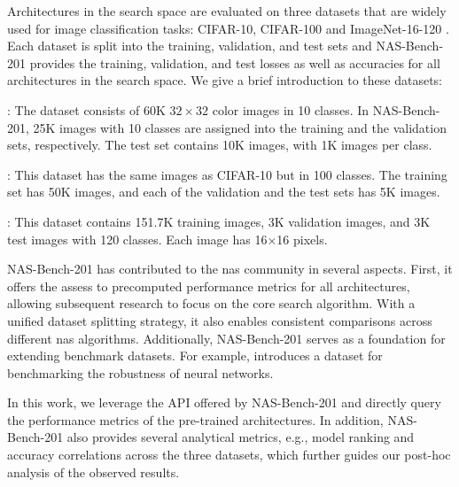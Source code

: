 \vspace{0.5em}

Architectures in the search space are evaluated on three datasets that are widely used for image classification tasks: CIFAR-10, CIFAR-100 \cite{krizhevsky2009learning} and ImageNet-16-120 \cite{chrabaszcz2017downsampled}. Each dataset is split into the training, validation, and test sets and NAS-Bench-201 provides the training, validation, and test losses as well as accuracies for all architectures in the search space. We give a brief introduction to these datasets:

\begin{description}[leftmargin=0cm, listparindent=\parindent]
 	\item[CIFAR10]:	The dataset consists of 60K $32\times32$ color images in 10 classes. In NAS-Bench-201, 25K images with 10 classes are assigned into the training and the validation sets, respectively. The test set contains 10K images, with 1K images per class.
 	\item[CIFAR100]: This dataset has the same images as CIFAR-10 but in 100 classes. The training set has 50K images, and each of the validation and the test sets has 5K images.
 	\item[ImageNet-16-120]: This dataset contains 151.7K training images, 3K validation images, and 3K test images with 120 classes. Each image has 16$\times$16 pixels.
\end{description} 


NAS-Bench-201 has contributed to the \gls{nas} community in several aspects. First, it offers the assess to precomputed performance metrics for all architectures, allowing subsequent research to focus on the core search algorithm. With a unified dataset splitting strategy, it also enables consistent comparisons across different \gls{nas} algorithms. Additionally, NAS-Bench-201 serves as a foundation for extending benchmark datasets. For example, \cite{jung2023neural} introduces a dataset for benchmarking the robustness of neural networks.

In this work, we leverage the API offered by NAS-Bench-201 and directly query the performance metrics of the pre-trained architectures. In addition, NAS-Bench-201 also provides several analytical metrics, e.g., model ranking and accuracy correlations across the three datasets, which further guides our post-hoc analysis of the observed results.
